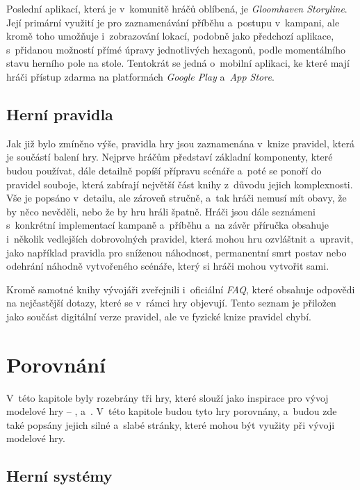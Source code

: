 Poslední aplikací, která je v~komunitě hráčů oblíbená, je \textit{Gloomhaven Storyline}. Její primární využití je pro zaznamenávání příběhu a~postupu v~kampani, ale kromě toho umožňuje i~zobrazování lokací, podobně jako předchozí aplikace, s~přidanou možností přímé úpravy jednotlivých hexagonů, podle momentálního stavu herního pole na stole. Tentokrát se jedná o~mobilní aplikaci, ke které mají hráči přístup zdarma na platformách \textit{Google Play} a~\textit{App Store}.

\subsection{Herní pravidla}
\label{subsec:gh_rules}

Jak již bylo zmíněno výše, pravidla hry jsou zaznamenána v~knize pravidel, která je součástí balení hry. Nejprve hráčům představí základní komponenty, které budou používat, dále detailně popíší přípravu scénáře a~poté se ponoří do pravidel souboje, která zabírají největší část knihy z~důvodu jejich komplexnosti. Vše je popsáno v~detailu, ale zároveň stručně, a~tak hráči nemusí mít obavy, že by něco nevěděli, nebo že by hru hráli špatně. Hráči jsou dále seznámeni s~konkrétní implementací kampaně a~příběhu a~na závěr příručka obsahuje i~několik vedlejších dobrovolných pravidel, která mohou hru ozvláštnit a~upravit, jako například pravidla pro sníženou náhodnost, permanentní smrt postav nebo odehrání náhodně vytvořeného scénáře, který si hráči mohou vytvořit sami.

Kromě samotné knihy vývojáři zveřejnili i~oficiální \textit{FAQ}, které obsahuje odpovědi na nejčastější dotazy, které se v~rámci hry objevují. Tento seznam je přiložen jako součást digitální verze pravidel, ale ve fyzické knize pravidel chybí.



\section{Porovnání}
\label{sec:comparison}

V~této kapitole byly rozebrány tři hry, které slouží jako inspirace pro vývoj modelové hry -- ,  a~. V~této kapitole budou tyto hry porovnány, a~budou zde také popsány jejich silné a~slabé stránky, které mohou být využity při vývoji modelové hry.

\subsection{Herní systémy}
\label{subsec:comparison_gameplay}

